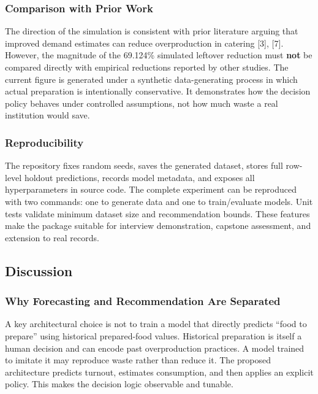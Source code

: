 \documentclass[conference]{IEEEtran}
\begin{document}
\subsubsection{Comparison with Prior
Work}\label{comparison-with-prior-work}

The direction of the simulation is consistent with prior literature
arguing that improved demand estimates can reduce overproduction in
catering {[}3{]}, {[}7{]}. However, the magnitude of the 69.124\%
simulated leftover reduction must \textbf{not} be compared directly with
empirical reductions reported by other studies. The current figure is
generated under a synthetic data-generating process in which actual
preparation is intentionally conservative. It demonstrates how the
decision policy behaves under controlled assumptions, not how much waste
a real institution would save.

\subsubsection{Reproducibility}\label{reproducibility}

The repository fixes random seeds, saves the generated dataset, stores
full row-level holdout predictions, records model metadata, and exposes
all hyperparameters in source code. The complete experiment can be
reproduced with two commands: one to generate data and one to
train/evaluate models. Unit tests validate minimum dataset size and
recommendation bounds. These features make the package suitable for
interview demonstration, capstone assessment, and extension to real
records.

\subsection{Discussion}\label{discussion}

\subsubsection{Why Forecasting and Recommendation Are
Separated}\label{why-forecasting-and-recommendation-are-separated}

A key architectural choice is not to train a model that directly
predicts ``food to prepare'' using historical prepared-food values.
Historical preparation is itself a human decision and can encode past
overproduction practices. A model trained to imitate it may reproduce
waste rather than reduce it. The proposed architecture predicts turnout,
estimates consumption, and then applies an explicit policy. This makes
the decision logic observable and tunable.
\end{document}
